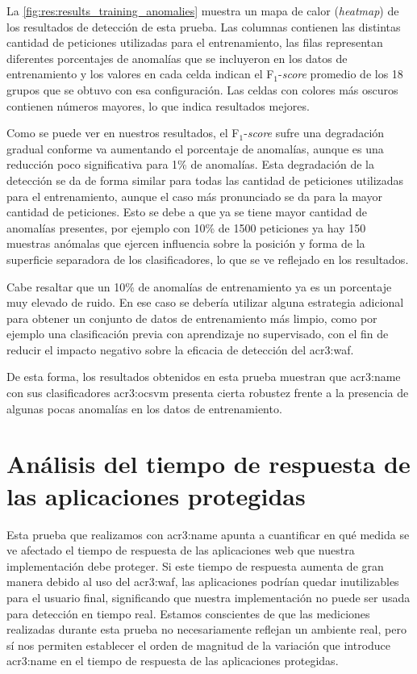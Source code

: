 La \autoref{fig:res:results_training_anomalies} muestra un mapa de calor
(\textit{heatmap}) de los resultados de detección de esta prueba. Las
columnas contienen las distintas cantidad de peticiones utilizadas para
el entrenamiento, las filas representan diferentes porcentajes de anomalías
que se incluyeron en los datos de entrenamiento y los valores en cada celda
indican el F$_{1}$-\textit{score} promedio de los 18 grupos que se obtuvo
con esa configuración. Las celdas con colores más oscuros contienen
números mayores, lo que indica resultados mejores.

Como se puede ver en nuestros resultados, el F$_{1}$-\textit{score} sufre
una degradación gradual conforme va aumentando el porcentaje de anomalías,
aunque es una reducción poco significativa para 1\% de anomalías.
Esta degradación de la detección se da de forma similar para todas las
cantidad de peticiones utilizadas para el entrenamiento, aunque el caso
más pronunciado se da para la mayor cantidad de peticiones. Esto se debe
a que ya se tiene mayor cantidad de anomalías presentes, por ejemplo
con 10\% de \num{1500} peticiones ya hay 150 muestras anómalas que ejercen
influencia sobre la posición y forma de la superficie separadora de los
clasificadores, lo que se ve reflejado en los resultados.

Cabe resaltar que un 10\% de anomalías de entrenamiento ya es un porcentaje
muy elevado de ruido. En ese caso se debería utilizar alguna estrategia
adicional para obtener un conjunto de datos de entrenamiento más limpio,
como por ejemplo una clasificación previa con aprendizaje no supervisado,
con el fin de reducir el impacto negativo sobre la eficacia de detección
del \gls{acr3:waf}.

De esta forma, los resultados obtenidos en esta prueba muestran que
\gls{acr3:name} con sus clasificadores \gls{acr3:ocsvm} presenta cierta
robustez frente a la presencia de algunas pocas anomalías en los datos
de entrenamiento.


\section{Análisis del tiempo de respuesta de las aplicaciones protegidas}

Esta prueba que realizamos con \gls{acr3:name} apunta a cuantificar en
qué medida se ve afectado el tiempo de respuesta de las aplicaciones web
que nuestra implementación debe proteger.
Si este tiempo de respuesta aumenta de gran manera debido al uso del
\gls{acr3:waf}, las aplicaciones podrían quedar inutilizables para el
usuario final, significando que nuestra implementación no puede ser
usada para detección en tiempo real.
Estamos conscientes de que las mediciones realizadas durante esta prueba
no necesariamente reflejan un ambiente real, pero sí nos permiten establecer
el orden de magnitud de la variación que introduce \gls{acr3:name} en
el tiempo de respuesta de las aplicaciones protegidas.

